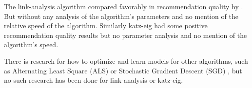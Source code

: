 The link-analysis algorithm compared favorably in recommendation quality by \citep{huang2007comparison}. But without any analysis of the algorithm's parameters and no mention of the relative speed of the algorithm.  Similarly katz-eig had some positive recommendation quality results \citep{shin2012multi} but no parameter analysis and no mention of the algorithm's speed.

There is research for how to optimize and learn models for other algorithms, such as Alternating Least Square (ALS) or Stochastic Gradient Descent (SGD)
, but no such research has been done for link-analysis or katz-eig.



